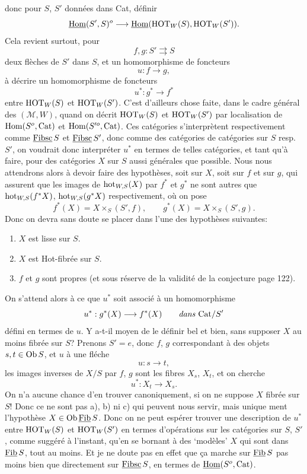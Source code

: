 donc pour $S$, $S'$ données dans Cat, définir
\[ \underline{\mathrm{Hom}}(S',S)^o \longrightarrow \underline{\mathrm{Hom}}(\mathrm{HOT}_W(S),\mathrm{HOT}_W(S')). \]
Cela revient surtout, pour
\[ f,g : S' \rightrightarrows S \]
deux flèches de $S'$ dans $S$, et un homomorphisme de foncteurs
\[ u : f \longrightarrow g, \]
à décrire un homomorphisme de foncteurs
\[ u^* : g^* \longrightarrow f^* \]
entre $\mathrm{HOT}_W(S)$ et $\mathrm{HOT}_W(S')$. C'est d'ailleurs chose faite, dans le cadre général des $(\mathcal{M},W)$, quand on décrit $\mathrm{HOT}_W(S)$ et $\mathrm{HOT}_W(S')$ par localisation de $\mathrm{Hom}(S^o,\mathrm{Cat})$ et $\mathrm{Hom}(S'^o,\mathrm{Cat})$. Ces catégories s'interprètent respectivement comme $\underline{\mathrm{Fibsc}}\,S$ et $\underline{\mathrm{Fibsc}}\,S'$, donc comme des catégories de catégories sur $S$ resp. $S'$, on voudrait donc interpréter $u^*$ en termes de telles catégories, et tant qu'à faire, pour des catégories $X$ sur $S$ aussi générales que possible. Nous nous
attendrons alors à devoir faire des hypothèses, soit sur $X$, soit sur $f$ et sur $g$, qui assurent que les images de $\mathrm{hot}_{W,S}(X)$ par $f^*$ et $g^*$ ne sont autres que $\mathrm{hot}_{W,S}(f^*X)$, $\mathrm{hot}_{W,S}(g^*X)$ respectivement, où on pose
\[ f^*(X) = X \times_S (S',f), \qquad g^*(X) = X \times_S (S',g). \]
Donc on devra sans doute se placer dans l'une des hypothèses suivantes:
\begin{enumerate}
\item[a)] $X$ est lisse sur $S$.
\item[b)] $X$ est Hot-fibrée sur $S$.
\item[c)] $f$ et $g$ sont propres (et sous réserve de la validité de la conjecture page 122).
\end{enumerate}
On s'attend alors à ce que $u^*$ soit associé à un homomorphisme
\[ u^* : g^*(X) \longrightarrow f^*(X) \qquad \textit{dans } \mathrm{Cat}/S' \]
défini en termes de $u$. Y a-t-il moyen de le définir bel et bien, sans supposer $X$ au moins fibrée sur $S$? Prenons $S'=e$, donc $f$, $g$ correspondant à des objets $s,t\in\mathrm{Ob}\,S$, et $u$ à une fléche %
\[ u : s \longrightarrow t, \]
les images inverses de $X/S$ par $f$, $g$ sont les fibres $X_s$, $X_t$, et on cherche
\[ u^* : X_t \longrightarrow X_s. \]
On n'a aucune chance d'en trouver canoniquement, si on ne suppose $X$ fibrée sur $S$! Donc ce ne sont pas a), b) ni c) qui peuvent nous servir, mais unique%
%
%
ment l'hypothèse $X\in\mathrm{Ob}\,\underline{\mathrm{Fib}}\,S$. Donc on ne peut espérer trouver une description de $u^*$ entre $\mathrm{HOT}_W(S)$ et $\mathrm{HOT}_W(S')$ en termes d'opérations sur les catégories sur $S$, $S'$, comme suggéré à l'instant, qu'en se bornant à des `modèles' $X$ qui sont dans $\underline{\mathrm{Fib}}\,S$, tout au moins. Et je ne doute pas en effet que ça marche sur $\underline{\mathrm{Fib}}\,S$ pas moins bien que directement sur $\underline{\mathrm{Fibsc}}\,S$, en termes de $\underline{\mathrm{Hom}}(S^o,\mathrm{Cat})$.

